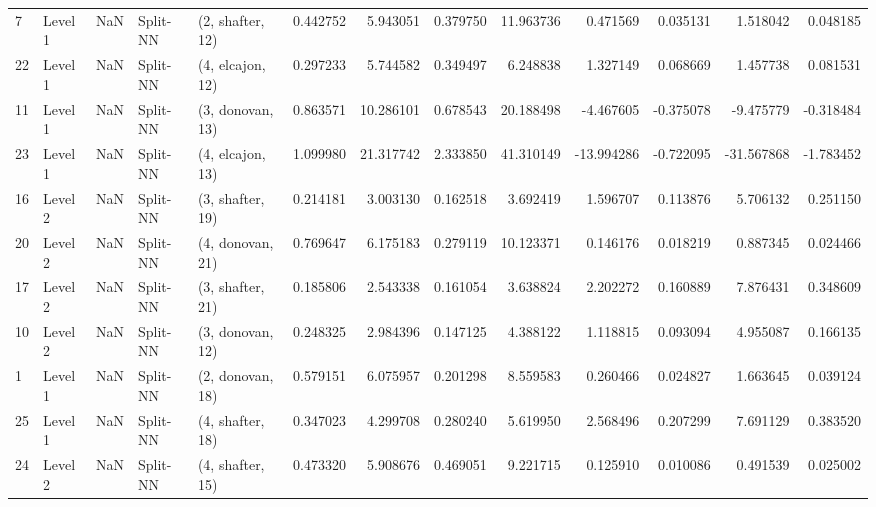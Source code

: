 \begin{tabular}{llrllrrrrrrrr}
7  &   Level 1 &    NaN &       Split-NN &  (2, shafter, 12) &   0.442752 &   5.943051 &  0.379750 &  11.963736 &             0.471569 &               0.035131 &            1.518042 &              0.048185 \\
22 &   Level 1 &    NaN &       Split-NN &  (4, elcajon, 12) &   0.297233 &   5.744582 &  0.349497 &   6.248838 &             1.327149 &               0.068669 &            1.457738 &              0.081531 \\
11 &   Level 1 &    NaN &       Split-NN &  (3, donovan, 13) &   0.863571 &  10.286101 &  0.678543 &  20.188498 &            -4.467605 &              -0.375078 &           -9.475779 &             -0.318484 \\
23 &   Level 1 &    NaN &       Split-NN &  (4, elcajon, 13) &   1.099980 &  21.317742 &  2.333850 &  41.310149 &           -13.994286 &              -0.722095 &          -31.567868 &             -1.783452 \\
16 &   Level 2 &    NaN &       Split-NN &  (3, shafter, 19) &   0.214181 &   3.003130 &  0.162518 &   3.692419 &             1.596707 &               0.113876 &            5.706132 &              0.251150 \\
20 &   Level 2 &    NaN &       Split-NN &  (4, donovan, 21) &   0.769647 &   6.175183 &  0.279119 &  10.123371 &             0.146176 &               0.018219 &            0.887345 &              0.024466 \\
17 &   Level 2 &    NaN &       Split-NN &  (3, shafter, 21) &   0.185806 &   2.543338 &  0.161054 &   3.638824 &             2.202272 &               0.160889 &            7.876431 &              0.348609 \\
10 &   Level 2 &    NaN &       Split-NN &  (3, donovan, 12) &   0.248325 &   2.984396 &  0.147125 &   4.388122 &             1.118815 &               0.093094 &            4.955087 &              0.166135 \\
1  &   Level 1 &    NaN &       Split-NN &  (2, donovan, 18) &   0.579151 &   6.075957 &  0.201298 &   8.559583 &             0.260466 &               0.024827 &            1.663645 &              0.039124 \\
25 &   Level 1 &    NaN &       Split-NN &  (4, shafter, 18) &   0.347023 &   4.299708 &  0.280240 &   5.619950 &             2.568496 &               0.207299 &            7.691129 &              0.383520 \\
24 &   Level 2 &    NaN &       Split-NN &  (4, shafter, 15) &   0.473320 &   5.908676 &  0.469051 &   9.221715 &             0.125910 &               0.010086 &            0.491539 &              0.025002 \\

\end{tabular}
